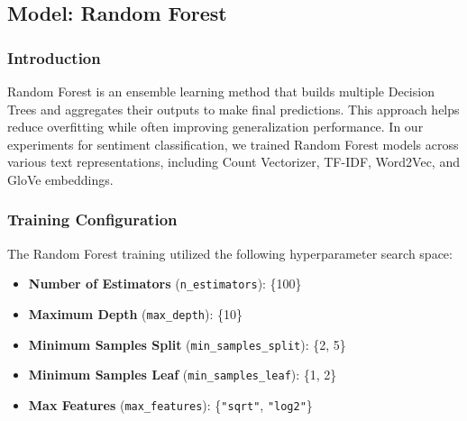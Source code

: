 \subsection{Model: Random Forest}

\subsubsection{Introduction}

Random Forest is an ensemble learning method that builds multiple Decision Trees and aggregates their outputs to make final predictions. This approach helps reduce overfitting while often improving generalization performance. In our experiments for sentiment classification, we trained Random Forest models across various text representations, including Count Vectorizer, TF-IDF, Word2Vec, and GloVe embeddings.

\subsubsection{Training Configuration}

The Random Forest training utilized the following hyperparameter search space:

\begin{itemize}
    \item \textbf{Number of Estimators} (\texttt{n\_estimators}): \{100\}
    \item \textbf{Maximum Depth} (\texttt{max\_depth}): \{10\}
    \item \textbf{Minimum Samples Split} (\texttt{min\_samples\_split}): \{2, 5\}
    \item \textbf{Minimum Samples Leaf} (\texttt{min\_samples\_leaf}): \{1, 2\}
    \item \textbf{Max Features} (\texttt{max\_features}): \{\texttt{"sqrt"}, \texttt{"log2"}\}
\end{itemize}



